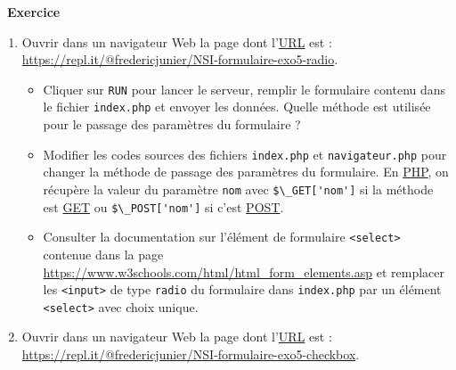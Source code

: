 \documentclass[
  11pt,
]{article}
\newcommand{\passthrough}[1]{#1}
\providecommand{\tightlist}{%
  \setlength{\itemsep}{0pt}\setlength{\parskip}{0pt}}
\newcounter{exo}
\newenvironment{exercice}[1]
{\par \medskip   \addtocounter{exo}{1} \noindent  
\begin{bclogo}[arrondi =0.1,   noborder = true, logo=\bccrayon, marge=4]{~\textbf{Exercice} \textbf{\theexo} {\itshape #1} }  \par}
{
\end{bclogo}
 \par \bigskip }
\newcounter{def}
\begin{document}
\begin{exercice}{}

\begin{enumerate}
\def\labelenumi{\arabic{enumi}.}
\item
  Ouvrir dans un navigateur Web la page dont
  l'\href{https://developer.mozilla.org/fr/docs/Glossaire/URL}{URL} est
  :\\
  \url{https://repl.it/@fredericjunier/NSI-formulaire-exo5-radio}.

  \begin{itemize}
  \tightlist
  \item
    Cliquer sur \passthrough{\lstinline!RUN!} pour lancer le serveur,
    remplir le formulaire contenu dans le fichier
    \passthrough{\lstinline!index.php!} et envoyer les données. Quelle
    méthode est utilisée pour le passage des paramètres du formulaire ?
  \item
    Modifier les codes sources des fichiers
    \passthrough{\lstinline!index.php!} et
    \passthrough{\lstinline!navigateur.php!} pour changer la méthode de
    passage des paramètres du formulaire. En
    \href{https://developer.mozilla.org/fr/docs/Glossaire/PHP}{PHP}, on
    récupère la valeur du paramètre \passthrough{\lstinline!nom!} avec
    \passthrough{\lstinline!$\_GET['nom']!} si la méthode est
    \href{https://developer.mozilla.org/fr/docs/Web/HTTP/M\%C3\%A9thode/GET}{GET}
    ou \passthrough{\lstinline!$\_POST['nom']!} si c'est
    \href{https://developer.mozilla.org/fr/docs/Web/HTTP/M\%C3\%A9thode/POST}{POST}.
  \item
    Consulter la documentation sur l'élément de formulaire
    \passthrough{\lstinline!<select>!} contenue dans la page
    \url{https://www.w3schools.com/html/html_form_elements.asp} et
    remplacer les \passthrough{\lstinline!<input>!} de type
    \passthrough{\lstinline!radio!} du formulaire dans
    \passthrough{\lstinline!index.php!} par un élément
    \passthrough{\lstinline!<select>!} avec choix unique.
  \end{itemize}
\item
  Ouvrir dans un navigateur Web la page dont
  l'\href{https://developer.mozilla.org/fr/docs/Glossaire/URL}{URL} est
  :\\
  \url{https://repl.it/@fredericjunier/NSI-formulaire-exo5-checkbox}.


\end{enumerate}
\end{exercice}
\end{document}
